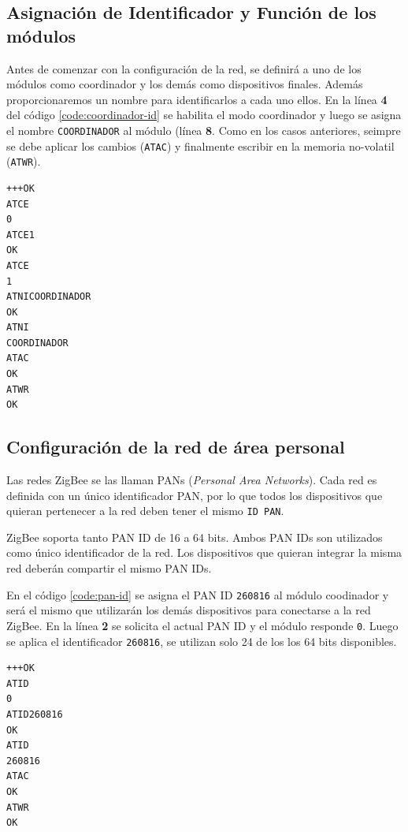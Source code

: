 \documentclass[11pt,oneside,spanish,a4paper]{article}
\begin{document}
\subsection{Asignación de Identificador y Función de los módulos}

Antes de comenzar con la configuración de la red, se definirá a uno de
los módulos como coordinador y los demás como dispositivos
finales. Además proporcionaremos un nombre para identificarlos a cada
uno ellos. En la línea \textbf{4} del código
\ref{code:coordinador-id}  se habilita el modo coordinador y luego se
asigna el nombre \texttt{COORDINADOR} al módulo (línea \textbf{8}.
 Como en los casos anteriores, seimpre se debe aplicar los cambios (\texttt{ATAC}) y
finalmente escribir en la memoria no-volatil (\texttt{ATWR}).
\begin{lstlisting}[emph={+++,ATCE,ATCE1,ATWR,ATAC,ATNI,ATCOORDINADOR},
    emphstyle={\color{blue}}, caption={Obtención del \textsl{seral
number}.}, label=code:coordinador-id]
+++OK
ATCE
0
ATCE1
OK
ATCE
1
ATNICOORDINADOR
OK
ATNI
COORDINADOR
ATAC
OK
ATWR
OK
\end{lstlisting}  

\subsection{Configuración de la red de área personal}

Las redes ZigBee se las llaman PANs (\textsl{Personal Area
  Networks}). Cada red es definida con un único identificador PAN, por
lo que todos los dispositivos que quieran pertenecer a la red deben
tener el mismo \texttt{ID PAN}. 

ZigBee soporta tanto PAN ID de 16 a 64 bits. Ambos PAN IDs son
utilizados como único identificador de la red. Los dispositivos que
quieran integrar la misma red deberán compartir el mismo PAN IDs. 

En el código \ref{code:pan-id} se asigna el PAN ID \texttt{260816} al
módulo coodinador y será el mismo que utilizarán los demás
dispositivos para conectarse a la red ZigBee. En la línea \textbf{2}
se solicita el actual PAN ID y el módulo responde \texttt{0}. Luego se
aplica el identificador \texttt{260816}, se utilizan solo 24 de los
los 64 bits disponibles. 

\begin{lstlisting}[emph={+++,ATWR,ATAC,ATID,ATID260816},
    emphstyle={\color{blue}}, caption={Obtención del \textsl{seral
number}.}, label=code:coordinador-id]
+++OK
ATID
0
ATID260816
OK
ATID
260816
ATAC
OK
ATWR
OK
\end{lstlisting}  
\end{document}
